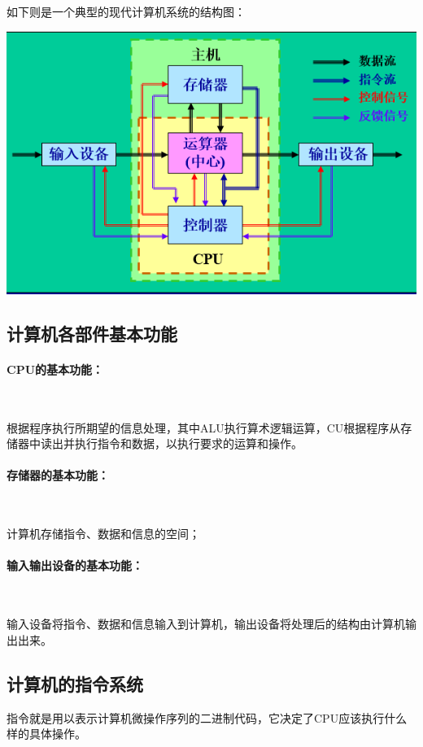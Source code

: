 \documentclass[UTF8]{ctexart}
\begin{document}
    如下则是一个典型的现代计算机系统的结构图：

    \includegraphics[width=1.0\textwidth]{img/计算机体系结构.png}

    \subsection{计算机各部件基本功能}
    \paragraph{CPU的基本功能：}

    ~

    根据程序执行所期望的信息处理，其中ALU执行算术逻辑运算，CU根据程序从存储器中读出并执行指令和数据，以执行要求的运算和操作。

    \paragraph{存储器的基本功能：}

    ~

    计算机存储指令、数据和信息的空间；

    \paragraph{输入输出设备的基本功能：}

    ~

    输入设备将指令、数据和信息输入到计算机，输出设备将处理后的结构由计算机输出出来。

    \subsection{计算机的指令系统}
    指令就是用以表示计算机微操作序列的二进制代码，它决定了CPU应该执行什么样的具体操作。
\end{document}
